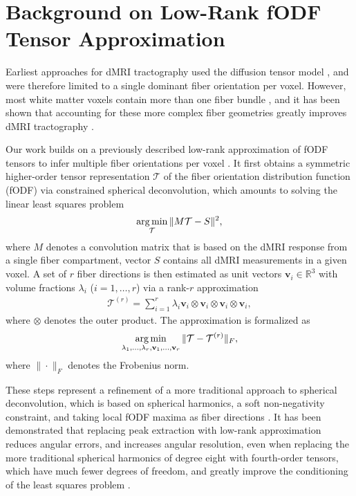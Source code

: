 \section{Background on Low-Rank fODF Tensor Approximation}\label{sec:background}
Earliest approaches for dMRI tractography used the diffusion tensor model
\cite{Mori:1999}, and were therefore limited to a single dominant fiber orientation
per voxel. However, most white matter voxels contain more than one fiber bundle \cite{Jeurissen:2012}, and it has been shown
that accounting for these more complex fiber geometries greatly improves dMRI
tractography \cite{Neher:2015}.

Our work builds on a previously described low-rank approximation of fODF tensors to infer multiple fiber orientations per voxel \cite{lowrank,Ankele:CARS2017}. It first obtains a symmetric higher-order tensor representation $\mathcal{T}$ of the fiber orientation distribution function (fODF) via constrained spherical deconvolution, which amounts to solving the linear least squares problem 
\begin{align}
	\operatorname*{arg\,min}_{\mathcal{T}} \| M \mathcal{T} - S \|^2,
	\label{eq:sd-min}
\end{align}
where 
$M$ denotes a convolution matrix that is based on the dMRI response from a single fiber compartment, vector $S$ contains all dMRI measurements in a given voxel. A set of $r$ fiber directions is then estimated as unit vectors $\mathbf{v}_i \in \mathbb{R}^3$ with volume fractions $\lambda_i$ ($i=1,\ldots,r$) via a rank-$r$
approximation 
\begin{align}
	\mathcal{T}^{\left( r \right)} = \sum_{i=1}^r \lambda_i \mathbf{v}_i
	\otimes \mathbf{v}_i \otimes \mathbf{v}_i \otimes \mathbf{v}_i,
	\label{eq:low-rank}
\end{align}
where $\otimes$ denotes the
outer product. The approximation is formalized as
\[ \operatorname*{arg\,min}_{\lambda_1, \dots , \lambda_r , \mathbf{v}_1, \dots , \mathbf{v}_r}
\| \mathcal{T} - \mathcal{T}^{\left( r \right)} \|_F, \]
where $\| \cdot \|_F$ denotes the Frobenius norm.

These steps represent a refinement of a more traditional approach to spherical deconvolution, which is based on spherical harmonics, a soft non-negativity constraint, and taking local fODF maxima as fiber directions \cite{TOURNIER20071459}. It has been demonstrated that replacing peak extraction with low-rank approximation reduces angular errors, and increases angular resolution, even when replacing the more traditional spherical harmonics of degree eight with fourth-order tensors, which have much fewer degrees of freedom, and greatly improve the conditioning of the least squares problem \cite{Ankele:CARS2017}.

